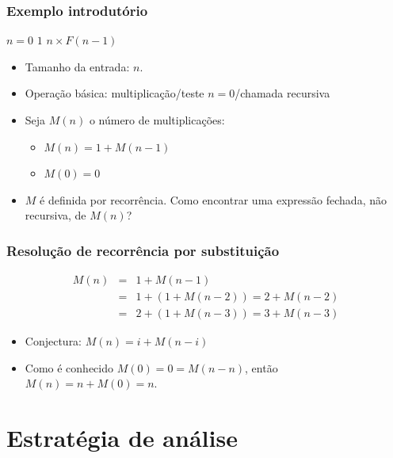 \documentclass[handout]{beamer}
\begin{document}
\begin{frame}
  \frametitle{Exemplo introdutório}

  \begin{example}[Fatorial]
\begin{codebox}
\li \If $n = 0$  \Return $1$
\li \Else \Return $n \times F(n-1)$
\end{codebox}
  \end{example}
  \pause

\begin{itemize}
\item Tamanho da entrada: $n$.
\item Operação básica: \alert{multiplicação}/teste $n=0$/chamada recursiva
\item Seja $M(n)$ o número de multiplicações:
\begin{itemize}
\item $M(n) = 1 + M(n-1)$
\item $M(0) = 0$
\end{itemize}
\item $M$ é definida por recorrência. Como encontrar uma expressão fechada,
não recursiva, de $M(n)$?
\end{itemize}
\end{frame}

\begin{frame}
  \frametitle{Resolução de recorrência por substituição}

\begin{eqnarray*}
M(n) & = & 1 + M(n-1) \\
& = & 1 + (1 + M(n-2)) = 2 + M(n-2) \\
& = & 2 + (1 + M(n-3)) = 3 + M(n-3) 
\end{eqnarray*}
\begin{itemize}
\item Conjectura: $M(n) = i + M(n-i)$
\item Como é conhecido $M(0) = 0 = M(n-n)$, então $M(n) = n + M(0) = n$.
\end{itemize}
\end{frame}

\section{Estratégia de análise}
\end{document}
